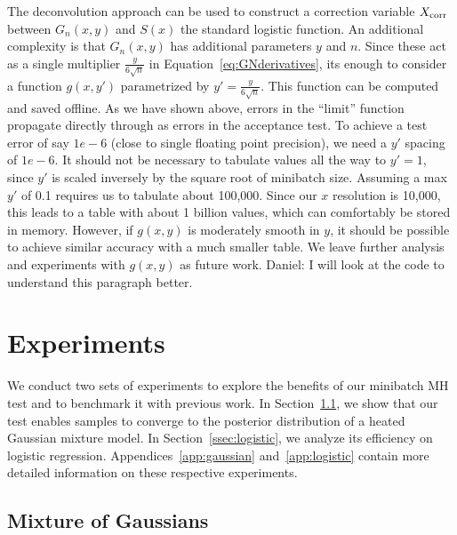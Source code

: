 \documentclass{article}
\begin{document}
The deconvolution approach can be used to construct a correction variable
$X_{\rm corr}$ between $G_n(x,y)$ and $S(x)$ the standard logistic function. An
additional complexity is that $G_n(x,y)$ has additional parameters $y$ and $n$.
Since these act as a single multiplier $\frac{y}{6\sqrt{n}}$ in
Equation~\ref{eq:GNderivatives}, its enough to consider a function $g(x,y')$
parametrized by $y'= \frac{y}{6\sqrt{n}}$. This function can be computed and
saved offline. As we have shown above, errors in the ``limit'' function
propagate directly through as errors in the acceptance test.  To achieve a test
error of say $1e-6$ (close to single floating point precision), we need a $y'$
spacing of $1e-6$. It should not be necessary to tabulate values all the way to
$y'=1$, since $y'$ is scaled inversely by the square root of minibatch size.
Assuming a max $y'$ of 0.1 requires us to tabulate about 100,000.  Since our $x$
resolution is 10,000, this leads to a table with about 1 billion values, which
can comfortably be stored in memory.  However, if $g(x,y)$ is moderately smooth
in $y$, it should be possible to achieve similar accuracy with a much smaller
table. We leave further analysis and experiments with $g(x,y)$ as future work.
{\color{blue} Daniel: I will look at the code to understand this paragraph better.}




\section{Experiments}\label{sec:experiments}

We conduct two sets of experiments to explore the benefits of our minibatch MH
test and to benchmark it with previous work. In Section~\ref{ssec:gaussians}, we
show that our test enables samples to converge to the posterior distribution of
a heated Gaussian mixture model. In Section~\ref{ssec:logistic}, we analyze its
efficiency on logistic regression.  Appendices~\ref{app:gaussian}
and~\ref{app:logistic} contain more detailed information on these respective
experiments.

\subsection{Mixture of Gaussians}\label{ssec:gaussians}
\end{document}

